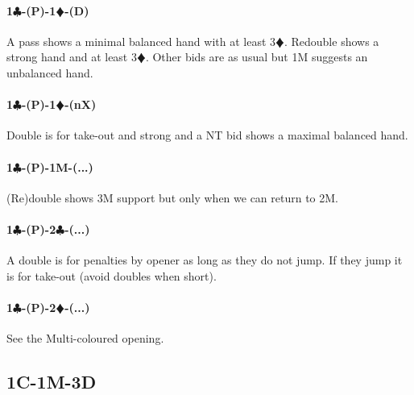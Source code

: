 \documentclass[a4paper]{article}
\newcommand{\BC}{\textcolor{OliveGreen}{$\clubsuit$}}
\newcommand{\BD}{\textcolor{RedOrange}{$\vardiamondsuit$}}
\newcommand{\pdfc}{\texorpdfstring{\BC{}}{C}}
\newcommand{\pdfd}{\texorpdfstring{\BD{}}{D}}
\begin{document}
\paragraph{1\pdfc-(P)-1\pdfd-(D)}

A pass shows a minimal balanced hand with at least 3\BD . Redouble shows a strong hand and at
least 3\BD . Other bids are as usual but 1M suggests an unbalanced hand.
\bigbreak
\paragraph{1\pdfc-(P)-1\pdfd-(nX)}

Double is for take-out and strong and a NT bid shows a maximal balanced hand.
\bigbreak
\paragraph{1\pdfc-(P)-1M-(...)}

(Re)double shows 3M support but only when we can return to 2M.
\bigbreak
\paragraph{1\pdfc-(P)-2\pdfc-(...)}

A double is for penalties by opener as long as they do not jump. If they jump
it is for take-out (avoid doubles when short).
\bigbreak
\paragraph{1\pdfc-(P)-2\pdfd-(...)}

See the Multi-coloured opening.
\bigbreak
\subsection{1C-1M-3D}
\end{document}
